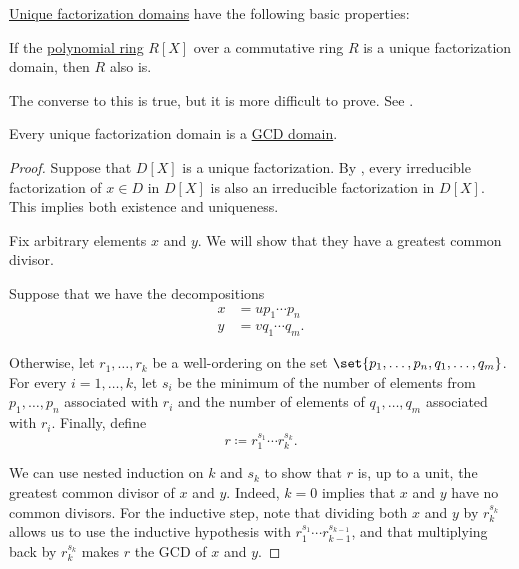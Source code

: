 \begin{proposition}\label{thm:def:unique_factorization_domain}
  \hyperref[def:unique_factorization_domain]{Unique factorization domains} have the following basic properties:
  \begin{thmenum}
     If the \hyperref[def:polynomial_algebra]{polynomial ring} \( R[X] \) over a commutative ring \( R \) is a unique factorization domain, then \( R \) also is.

    The converse to this is true, but it is more difficult to prove. See .

     Every unique factorization domain is a \hyperref[def:gcd_domain]{GCD domain}.
  \end{thmenum}
\end{proposition}
\begin{proof}
   Suppose that \( D[X] \) is a unique factorization. By , every irreducible factorization of \( x \in D \) in \( D[X] \) is also an irreducible factorization in \( D[X] \). This implies both existence and uniqueness.

   Fix arbitrary elements \( x \) and \( y \). We will show that they have a greatest common divisor.

  Suppose that we have the decompositions
  \begin{align*}
    x &= u p_1 \cdots p_n \\
    y &= v q_1 \cdots q_m.
  \end{align*}

  Otherwise, let \( r_1, \ldots, r_k \) be a well-ordering on the set \( \set{ p_1, \ldots, p_n, q_1, \ldots, q_m } \). For every \( i = 1, \ldots, k \), let \( s_i \) be the minimum of the number of elements from \( p_1, \ldots, p_n \) associated with \( r_i \) and the number of elements of \( q_1, \ldots, q_m \) associated with \( r_i \). Finally, define
  \begin{equation*}
    r \coloneqq r_1^{s_1} \cdots r_k^{s_k}.
  \end{equation*}

  We can use nested induction on \( k \) and \( s_k \) to show that \( r \) is, up to a unit, the greatest common divisor of \( x \) and \( y \). Indeed, \( k = 0 \) implies that \( x \) and \( y \) have no common divisors. For the inductive step, note that dividing both \( x \) and \( y \) by \( r_k^{s_k} \) allows us to use the inductive hypothesis with \( r_1^{s_1} \cdots r_{k-1}^{s_{k-1}} \), and that multiplying back by \( r_k^{s_k} \) makes \( r \) the GCD of \( x \) and \( y \).
\end{proof}

